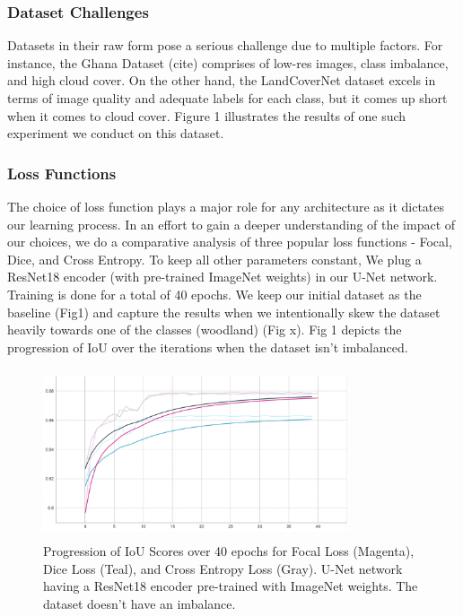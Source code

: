 \documentclass[conference]{IEEEtran}
\begin{document}
\subsubsection{Dataset Challenges}
Datasets in their raw form pose a serious challenge due to multiple factors. For instance, the Ghana Dataset (cite) comprises of low-res images, class imbalance, and high cloud cover. On the other hand, the LandCoverNet dataset excels in terms of image quality and adequate labels for each class, but it comes up short when it comes to cloud cover. Figure 1 illustrates the results of one such experiment we conduct on this dataset.

\subsubsection{Loss Functions} The choice of loss function plays a major role for any architecture as it dictates our learning process. In an effort to gain a deeper understanding of the impact of our choices, we do a comparative analysis of three popular loss functions - Focal, Dice, and Cross Entropy. To keep all other parameters constant, We plug a ResNet18 encoder (with pre-trained ImageNet weights) in our U-Net network. Training is done for a total of 40 epochs. We keep our initial dataset as the baseline (Fig1) and capture the results when we intentionally skew the dataset heavily towards one of the classes (woodland) (Fig x). Fig 1 depicts the progression of IoU over the iterations when the dataset isn't imbalanced.
\usepackage{float}

\begin{figure}[!h]
    \includegraphics[width=9cm, height=5cm]{images/roads-losses/three-losses-iou.png}
    \caption{Progression of IoU Scores over 40 epochs for Focal Loss (Magenta), Dice Loss (Teal), and Cross Entropy Loss (Gray). U-Net network having a ResNet18 encoder pre-trained with ImageNet weights. The dataset doesn't have an imbalance. }
\end{figure}
\end{document}
